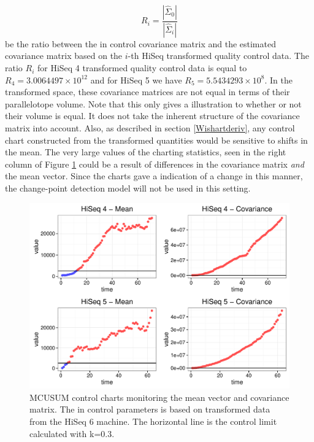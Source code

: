 \documentclass[a4paper,11pt,fleqn,twoside,notitlepage]{report}\usepackage[]{graphicx}\usepackage[]{color}
\makeatletter
\def\maxwidth{ %
  \ifdim\Gin@nat@width>\linewidth
    \linewidth
  \else
    \Gin@nat@width
  \fi
}
\newenvironment{knitrout}{}{} %
\makeatother
\begin{document}
$$
R_{i} = \frac{|\widehat{\Sigma}_0|}{|\widehat{\Sigma}_i|}
$$
be the ratio between the in control covariance matrix and the estimated covariance matrix based on the $i$-th HiSeq transformed quality control data. The ratio $R_{i}$ for HiSeq 4 transformed quality control data is equal to $R_{4}=\ensuremath{3.0064497\times 10^{12}}$ and for HiSeq 5 we have $R_{5}=\ensuremath{5.5434293\times 10^{8}}$. In the transformed space, these covariance matrices are not equal in terms of their parallelotope volume. Note that this only gives a illustration to whether or not their volume is equal. It does not take the inherent structure of the covariance matrix into account. Also, as described in section \ref{Wishartderiv}, any control chart constructed from the transformed quantities would be sensitive to shifts in the mean. The very large values of the charting statistics, seen in the right column of Figure \ref{fig:HiSeq45MCUSUMfig} could be a result of differences in the covariance matrix \textit{and} the mean vector. Since the charts gave a indication of a change in this manner, the change-point detection model will not be used in this setting.


\begin{knitrout}
\color{fgcolor}\begin{figure}[!ht]
\includegraphics[width=\maxwidth]{figure/HiSeq45MCUSUMfig-1} \caption[MCUSUM control charts monitoring the mean vector and covariance matrix]{MCUSUM control charts monitoring the mean vector and covariance matrix. The in control parameters is based on transformed data from the HiSeq 6 machine. The horizontal line is the control limit calculated with k=0.3.}\label{fig:HiSeq45MCUSUMfig}
\end{figure}


\end{knitrout}
\end{document}
